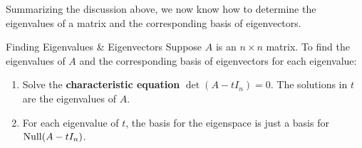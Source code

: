 \documentclass[mathshortcuts, colorful]{notes}
\begin{document}
    Summarizing the discussion above, we now know how to determine the eigenvalues of a matrix and the corresponding basis of eigenvectors. 
    \begin{cfact}{Finding Eigenvalues \& Eigenvectors}{}
        Suppose $A$ is an $n\times n$ matrix. To find the eigenvalues of $A$ and the corresponding basis of eigenvectors for each eigenvalue: 
        \begin{enumerate}
            \item Solve the \textbf{characteristic equation} $\det(A - tI_n) = 0$. The solutions in $t$ are the eigenvalues of $A$. 
            \item For each eigenvalue of $t$, the basis for the eigenspace is just a basis for $\operatorname{Null}(A - tI_n)$.
        \end{enumerate}
    \end{cfact}
\end{document}
